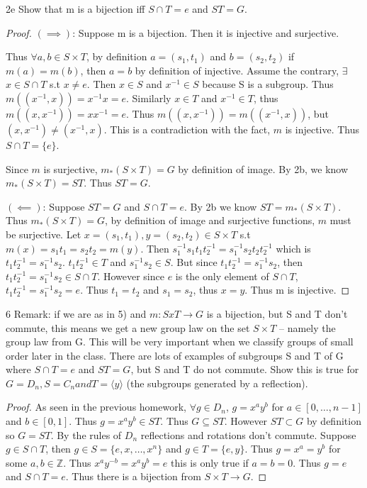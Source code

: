 \documentclass{article}
\newcommand{\Z}{\mathbb{Z}}
\newcommand{\angles}[1]{\langle{#1}\rangle}
\begin{document}
\begin{claim}{2e}
    Show that m is a bijection iff $S \cap T = e$ and $ST = G$. 
\end{claim}
\begin{proof}
    $(\implies)$: Suppose m is a bijection. Then it is injective and surjective. 

    Thus $\forall a, b \in S \times T$, by definition $a = (s_1, t_1)$ and $b = (s_2, t_2)$ if $m(a) = m(b)$, then $a = b$ by definition of injective. Assume the contrary, $\exists$ $x \in S \cap T$ s.t $x \neq e$. Then $x \in S$ and $x^{-1} \in S$ because S is a subgroup. Thus $m((x^{-1}, x)) = x^{-1}x = e$. Similarly $x \in T$ and $x^{-1} \in T$, thus $m((x, x^{-1})) = xx^{-1} = e$. Thus $m((x, x^{-1})) = m((x^{-1}, x))$, but $(x, x^{-1}) \neq (x^{-1}, x)$. This is a contradiction with the fact, $m$ is injective. Thus $S \cap T = \{e\}$.

    Since $m$ is surjective, $m_*(S \times T) = G$ by definition of image. By 2b, we know $m_*(S \times T) = ST$. Thus $ST = G$.

    $(\impliedby)$: Suppose $ST = G$ and $S \cap T = e$. By 2b we know $ST = m_*(S \times T)$. Thus $m_*(S \times T) = G$, by definition of image and surjective functions, $m$ must be surjective. Let $x = (s_1, t_1), y= (s_2, t_2) \in S \times T$ s.t $m(x) = s_1t_1 = s_2t_2 = m(y)$. Then $s_1^{-1}s_1t_1t_2^{-1} = s_1^{-1}s_2t_2t_2^{-1}$ which is $t_1t_2^{-1} = s_1^{-1}s_2$. $t_1t_2^{-1} \in T$ and $ s_1^{-1}s_2 \in S$. But since $t_1t_2^{-1} = s_1^{-1}s_2$, then $t_1t_2^{-1} = s_1^{-1}s_2 \in S \cap T$. However since $e$ is the only element of $S \cap T$, $t_1t_2^{-1} = s_1^{-1}s_2 = e$. Thus $t_1 = t_2$ and $s_1 = s_2$, thus $x = y$. Thus m is injective.
\end{proof}

\bigskip


\begin{PROB}{6}\label{Problem 6.}
    Remark: if we are as in 5) and $m: S x T \to G$ is a bijection, but S and T don't commute, this means we get a new group law on the set $S \times  T$ -- namely the group law from G. This will be very important when we classify groups of small order later in the class. There are lots of examples of subgroups S and T of G where $S \cap T = e$ and $ST = G$, but S and T do not commute. Show this is true for  $G = D_n, S = C_n and T = \angles{y}$ (the subgroups generated by a reflection).
\end{PROB}
\begin{proof}
    As seen in the previous homework, $\forall g \in D_n$, $g = x^ay^b$ for $a \in [0, \ldots, n-1]$ and $b \in [0, 1]$. Thus $g = x^ay^b \in ST$. Thus $G \subseteq ST$. However $ST \subset G$ by definition so $G = ST$. By the rules of $D_n$ reflections and rotations don't commute. Suppose $g \in S \cap T$, then $g \in S = \{e, x, \ldots, x^n\}$ and $g \in T = \{e, y\}$. Thus $g = x^a = y^b$ for some $a, b \in \Z$. Thus $x^ay^{-b} = x^a y^b = e$ this is only true if $a = b = 0$. Thus $g =e$ and $S \cap T = e$. Thus there is a bijection from $S \times T \to G$.
\end{proof}
\end{document}
